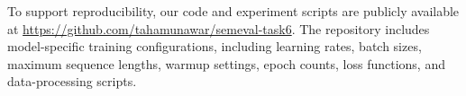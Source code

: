 \documentclass[11pt]{article}
\begin{document}
To support reproducibility, our code and experiment scripts are publicly available at \url{https://github.com/tahamunawar/semeval-task6}. The repository includes model-specific training configurations, including learning rates, batch sizes, maximum sequence lengths, warmup settings, epoch counts, loss functions, and data-processing scripts.





\end{document}
